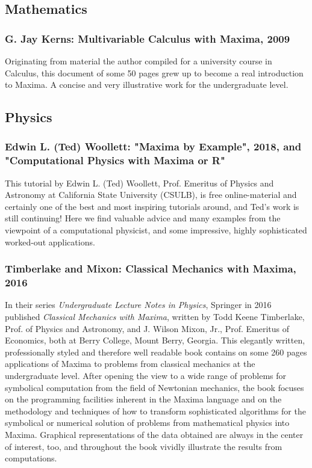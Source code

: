 \documentclass[../Maxima_Workbook.tex]{subfiles}
\begin{document}
\subsection{Mathematics}

\subsubsection{G. Jay Kerns: Multivariable Calculus with Maxima, 2009}

Originating from material the author compiled for a university course in Calculus, this document of some 50 pages grew up to become a real introduction to Maxima. A concise and very illustrative work for the undergraduate level.

\subsection{Physics}

\subsubsection{Edwin L. (Ted) Woollett: "Maxima by Example", 2018, and "Computational Physics with Maxima or R"}

This tutorial by Edwin L. (Ted) Woollett, Prof. Emeritus of Physics and Astronomy at California State University (CSULB), is free online-material and certainly one of the best and most inspiring tutorials around, and Ted's work is still continuing! Here we find valuable advice and many examples from the viewpoint of a computational physicist, and some impressive, highly sophisticated worked-out applications.

\subsubsection{Timberlake and Mixon: Classical Mechanics with Maxima, 2016}

In their series \emph{Undergraduate Lecture Notes in Physics}, Springer in 2016 published \emph{Classical Mechanics with Maxima}, written by Todd Keene Timberlake, Prof. of Physics and Astronomy, and J. Wilson Mixon, Jr., Prof. Emeritus of Economics, both at Berry College, Mount Berry, Georgia. This elegantly written, professionally styled and therefore well readable book contains on some 260 pages applications of Maxima to problems from classical mechanics at the undergraduate level. After opening the view to a wide range of problems for symbolical computation from the field of Newtonian mechanics, the book focuses on the programming facilities inherent in the Maxima language and on the methodology and techniques of how to transform sophisticated algorithms for the symbolical or numerical solution of problems from mathematical physics into Maxima. Graphical representations of the data obtained are always in the center of interest, too, and throughout the book vividly illustrate the results from computations.
\end{document}
